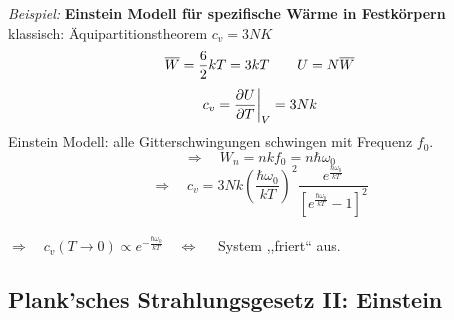 \emph{Beispiel:} \textbf{Einstein Modell für spezifische Wärme in Festkörpern}\\[5pt]
klassisch: Äquipartitionstheorem $ c_v = 3 N K $
\begin{equation*}
\overline{W} = \frac{6}{2} k T = 3 kT \qquad U = N \overline{W}
\end{equation*}
\begin{equation*}
c_v = \frac{\partial U}{\partial T}\bigg|_V = 3 N k
\end{equation*}
Einstein Modell: alle Gitterschwingungen schwingen mit Frequenz $ f_0 $.
\begin{equation*}
\Rightarrow \quad W_n = n k f_0 = n \hbar \omega_0
\end{equation*}
\begin{equation*}
\Rightarrow \quad c_v = 3 N k \left(\frac{\hbar \omega_0}{kT}\right)^2 \frac{e^{\frac{\hbar \omega_0}{kT}}}{\left[e^{\frac{\hbar \omega_0}{kT}} - 1\right]^2}
\end{equation*}
\\
$ \Rightarrow \quad c_v(T \to 0) \propto e^{-\frac{\hbar \omega_0}{kT}} \quad \Leftrightarrow \quad  $ System ,,friert`` aus.


\noindent
{}

\subsection{Plank'sches Strahlungsgesetz II: Einstein}

